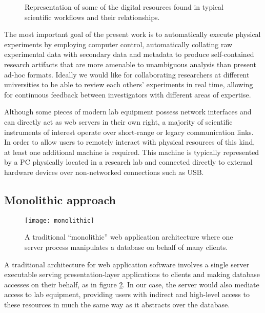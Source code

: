 \documentclass[../thesis]{subfiles}
\begin{document}
\begin{figure}
  \caption{
    Representation of some of the digital resources found in typical
    scientific workflows and their relationships.
    \label{fig:PhysArch}
  }
\end{figure}

The most important goal of the present work is to automatically
execute physical experiments by employing computer control,
automatically collating raw experimental data with secondary data and
metadata to produce self-contained research artifacts that are more
amenable to unambiguous analysis than present ad-hoc formats.
Ideally we would like for collaborating researchers at different
universities to be able to review each others' experiments in real
time, allowing for continuous feedback between investigators with
different areas of expertise.

Although some pieces of modern lab equipment possess network interfaces
and can directly act as web servers in their own right, a majority of
scientific instruments of interest operate over short-range or legacy
communication links. In order to allow users to remotely interact with
physical resources of this kind, at least one additional machine is
required. This machine is typically represented by a PC physically
located in a research lab and connected directly to external hardware
devices over non-networked connections such as USB.

\subsection{Monolithic approach}
\begin{figure}
  \texttt{[image: monolithic]}
  \caption{
    A traditional ``monolithic'' web application architecture where
    one server process manipulates a database on behalf of many clients.
    \label{fig:Monolithic}
  }
\end{figure}

A traditional architecture for web application software involves a
single server executable serving presentation-layer applications to
clients and making database accesses on their behalf, as in figure
\ref{fig:Monolithic}. In our case, the server would also mediate
access to lab equipment, providing users with indirect and high-level
access to these resources in much the same way as it abstracts over
the database.
\end{document}
